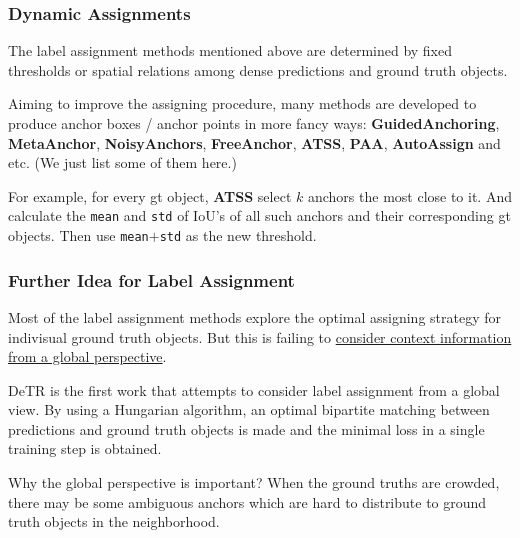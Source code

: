 \documentclass[slidetop, mathserif, dvipsnames]{beamer}
\begin{document}
\begin{frame}
    \frametitle{Dynamic Assignments}

    The label assignment methods mentioned above are determined by fixed thresholds
    or spatial relations among dense predictions and ground truth objects.

    \quad

    Aiming to improve the assigning procedure, many methods are developed
    to produce anchor boxes / anchor points in more fancy ways:
    {\bf GuidedAnchoring}, {\bf MetaAnchor}, {\bf NoisyAnchors},
    {\bf FreeAnchor}, {\bf ATSS}, {\bf PAA}, {\bf AutoAssign} and etc.
    (We just list some of them here.)

    \quad

    For example, for every gt object, {\bf ATSS} select $k$ anchors the most
    close to it. And calculate the {\tt mean} and {\tt std} of IoU's of all
    such anchors and their corresponding gt objects.
    Then use {\tt mean$+$std} as the new threshold.

\end{frame}

\begin{frame}
    \frametitle{Further Idea for Label Assignment}

    Most of the label assignment methods explore the optimal assigning strategy
    for indivisual ground truth objects. But this is failing to
    \underline{consider context information from a global perspective}.

    \quad

    DeTR is the first work that attempts to consider label assignment from
    a global view. By using a Hungarian algorithm,
    an optimal bipartite matching between predictions
    and ground truth objects is made
    and the minimal loss in a single training step is obtained.

    \quad

    Why the global perspective is important?
    When the ground truths are crowded, there may be some ambiguous
    anchors which are hard to distribute to ground truth
    objects in the neighborhood.

\end{frame}
\end{document}

